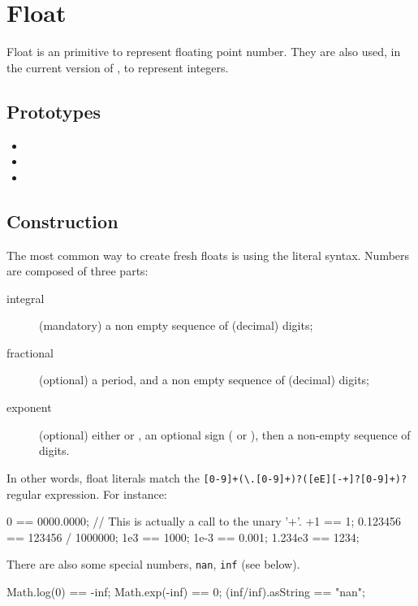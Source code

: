 \section{Float}

Float is an \us primitive to represent floating point number.  They
are also used, in the current version of \us, to represent integers.

\subsection{Prototypes}

\begin{itemize}
\item {}
\item {}
\item {}
\end{itemize}

\subsection{Construction}
\label{sec:float:ctor}

The most common way to create fresh floats is using the literal
syntax.  Numbers are composed of three parts:
\begin{description}
\item[integral] (mandatory) a non empty sequence of (decimal) digits;
\item[fractional] (optional) a period, and a non empty sequence of
  (decimal) digits;
\item[exponent] (optional) either  or , an optional
  sign (\samp{+} or \samp{-}), then a non-empty sequence of digits.
\end{description}

In other words, float literals match the
\lstinline|[0-9]+(\.[0-9]+)?([eE][-+]?[0-9]+)?|
regular expression.  For instance:

\begin{urbiassert}
0 == 0000.0000;
// This is actually a call to the unary '+'.
+1 == 1;
0.123456 == 123456 / 1000000;
1e3 == 1000;
1e-3 == 0.001;
1.234e3 == 1234;
\end{urbiassert}

There are also some special numbers, \lstinline|nan|, \lstinline|inf|
(see below).

\begin{urbiassert}[firstnumber=last]
Math.log(0) == -inf;
Math.exp(-inf) == 0;
(inf/inf).asString == "nan";
\end{urbiassert}

